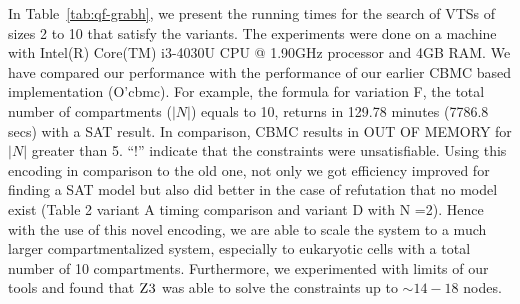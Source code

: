 

In Table~\ref{tab:qf-grabh}, we present the running times for the search of
VTSs of sizes 2 to 10 that satisfy the variants.
%
The experiments were done on a machine with Intel(R) Core(TM) i3-4030U
CPU @ 1.90GHz processor and 4GB RAM.
%
We have compared our performance with the performance of our earlier 
CBMC based implementation (O'cbmc).
%
For example, the formula for variation F, the total number of
compartments ($|N|$) equals to 10, returns in 129.78 minutes (7786.8 secs)
with a SAT result.
%
In comparison, CBMC results in OUT OF MEMORY for $|N|$ greater than 5.
%
``!'' indicate that the constraints were unsatisfiable.
%
Using this encoding in comparison to the old one, not only we got
efficiency improved for finding a SAT model but also did better in the
case of refutation that no model exist (Table 2 variant A timing
comparison and variant D with N =2).
%
Hence with the use of this novel encoding, we are able to scale the system to a much larger compartmentalized system, especially to
eukaryotic cells with a total number of 10 compartments.
%
%
Furthermore, we experimented with limits of our tools and found
that $\textsc{Z3}$ was able to solve the constraints up to $\sim{14-18}$ nodes.



% 






